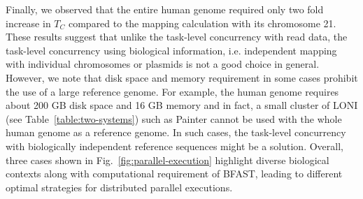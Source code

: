 \documentclass{cpeauth}
\begin{document}
Finally, we observed that the entire human genome required only two fold increase in $T_C$ compared to the mapping calculation with its chromosome 21.  These results suggest that unlike the task-level concurrency with read data, the task-level concurrency using biological information, i.e. independent mapping with individual chromosomes or plasmids is not a good choice in general. However, we note that disk space and memory requirement in some cases prohibit the use of a large reference genome.  For example, the human genome requires about 200 GB disk space and 16 GB memory and in fact, a small cluster of LONI (see Table~\ref{table:two-systems}) such as Painter cannot be used with the whole human genome as a reference genome.   In such cases, the task-level concurrency with biologically independent reference sequences might be a solution.   Overall, three cases shown in
Fig.~\ref{fig:parallel-execution} highlight diverse biological
contexts along with computational requirement of BFAST, leading to different optimal strategies for distributed
parallel executions.





 
\end{document}

